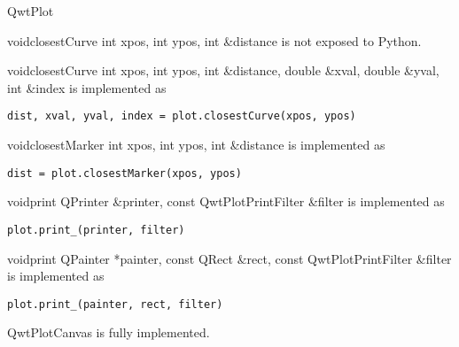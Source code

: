 \documentclass{manual}
\begin{document}
\begin{classdesc*}{QwtPlot}

  \begin{cfuncdesc}{void}{closestCurve}{
      int xpos, int ypos, int \&distance}
    is not exposed to Python.
  \end{cfuncdesc}

  \begin{cfuncdesc}{void}{closestCurve}{
      int xpos, int ypos, int \&distance,
      double \&xval, double \&yval, int \&index}
    is implemented as
    \begin{verbatim}
dist, xval, yval, index = plot.closestCurve(xpos, ypos)
    \end{verbatim}
  \end{cfuncdesc}

  \begin{cfuncdesc}{void}{closestMarker}{
      int xpos, int ypos, int \&distance}
    is implemented as
    \begin{verbatim}
dist = plot.closestMarker(xpos, ypos)
    \end{verbatim}
  \end{cfuncdesc}

  \begin{cfuncdesc}{void}{print}{
      QPrinter \&printer, const QwtPlotPrintFilter \&filter}
    is implemented as
    \begin{verbatim}
plot.print_(printer, filter)
    \end{verbatim}
  \end{cfuncdesc}

  \begin{cfuncdesc}{void}{print}{
      QPainter *painter,
      const QRect \&rect,
      const QwtPlotPrintFilter \&filter}
    is implemented as
    \begin{verbatim}
plot.print_(painter, rect, filter)
    \end{verbatim}
  \end{cfuncdesc}

\end{classdesc*}

\begin{classdesc*}{QwtPlotCanvas}
  is fully implemented.
\end{classdesc*}
\end{document}
